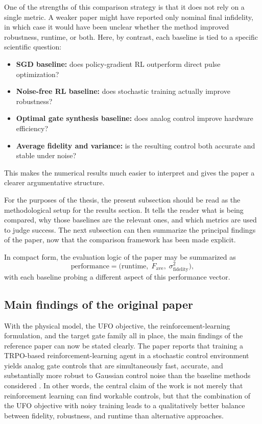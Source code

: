 One of the strengths of this comparison strategy is that it does not rely on a single metric. A weaker paper might have reported only nominal final infidelity, in which case it would have been unclear whether the method improved robustness, runtime, or both. Here, by contrast, each baseline is tied to a specific scientific question:
\begin{itemize}
\item \textbf{SGD baseline:} does policy-gradient RL outperform direct pulse optimization?
\item \textbf{Noise-free RL baseline:} does stochastic training actually improve robustness?
\item \textbf{Optimal gate synthesis baseline:} does analog control improve hardware efficiency?
\item \textbf{Average fidelity and variance:} is the resulting control both accurate and stable under noise?
\end{itemize}
This makes the numerical results much easier to interpret and gives the paper a clearer argumentative structure.

For the purposes of the thesis, the present subsection should be read as the methodological setup for the results section. It tells the reader what is being compared, why those baselines are the relevant ones, and which metrics are used to judge success. The next subsection can then summarize the principal findings of the paper, now that the comparison framework has been made explicit.

In compact form, the evaluation logic of the paper may be summarized as
\begin{equation}
\text{performance}
=
\bigl(
\text{runtime},
\;
F_{\mathrm{ave}},
\;
\sigma_{\mathrm{fidelity}}^{2}
\bigr),
\label{eq:evaluation_triplet}
\end{equation}
with each baseline probing a different aspect of this performance vector.

\subsection{Main findings of the original paper}
\label{subsec:main_findings_original_paper}


With the physical model, the UFO objective, the reinforcement-learning formulation, and the target gate family all in place, the main findings of the reference paper can now be stated clearly. The paper reports that training a TRPO-based reinforcement-learning agent in a stochastic control environment yields analog gate controls that are simultaneously fast, accurate, and substantially more robust to Gaussian control noise than the baseline methods considered \cite{Niu2019}. In other words, the central claim of the work is not merely that reinforcement learning can find workable controls, but that the combination of the UFO objective with noisy training leads to a qualitatively better balance between fidelity, robustness, and runtime than alternative approaches.

